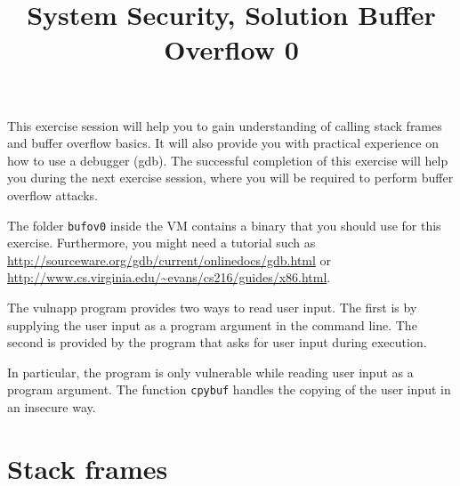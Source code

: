 \documentclass[a4paper,11pt]{article}
\title{System Security,
\ifsolution Solution \else \fi
Buffer Overflow 0}
\begin{document}
\maketitle

This exercise session will help you to gain understanding of calling stack frames
and buffer overflow basics. It will also provide you with practical experience on
how to use a debugger (gdb). The successful completion of this exercise will help
you during the next exercise session, where you will be required to perform buffer
overflow attacks.

The folder \texttt{bufov0} inside the VM contains a binary that you should use
for this exercise. Furthermore, you might need a tutorial such as
\url{http://sourceware.org/gdb/current/onlinedocs/gdb.html} or
\url{http://www.cs.virginia.edu/~evans/cs216/guides/x86.html}.

The {\sc vulnapp} program provides two ways to read user input. The first is by
supplying the user input as a program argument in the command line. The second is
provided by the program that asks for user input during execution.

In particular, the program is only vulnerable while reading user input as a program
argument. The function {\tt cpybuf} handles the copying of the
user input in an  insecure way.

\section*{Stack frames}
\end{document}

